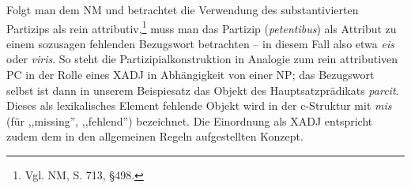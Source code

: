 \documentclass[12pt,a4paper]{article}
\begin{document}
Folgt man dem NM und betrachtet die Verwendung des substantivierten Partizips als rein attributiv,\footnote{Vgl. NM, S. 713, §498.} muss man das Partizip (\textit{petentibus}) als Attribut zu einem sozusagen fehlenden Bezugswort betrachten -- in diesem Fall also etwa \textit{eis} oder \textit{viris}. So steht die Partizipialkonstruktion in Analogie zum rein attributiven PC in der Rolle eines XADJ in Abhängigkeit von einer NP; das Bezugswort selbst ist dann in unserem Beispiesatz das Objekt des Hauptsatzprädikats \textit{parcit}. Dieses als lexikalisches Element fehlende Objekt wird in der c-Struktur mit \textit{mis} (für ,,missing'', ,,fehlend'') bezeichnet.  
Die Einordnung als XADJ entspricht zudem dem in den allgemeinen Regeln aufgestellten Konzept.
\end{document}
